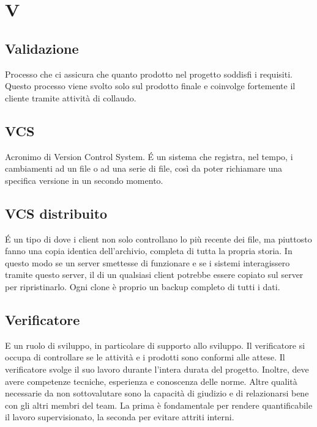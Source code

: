 \section*{V}
\markright{}

\subsection*{Validazione}
Processo che ci assicura che quanto prodotto nel progetto soddisfi i requisiti. Questo processo viene svolto solo sul prodotto finale e coinvolge fortemente il cliente tramite attività di collaudo.

\subsection*{VCS}
Acronimo di Version Control System. \'E un sistema che registra, nel tempo, i cambiamenti ad un file o ad una serie di file, così da poter richiamare una specifica versione in un secondo momento.

\subsection*{VCS distribuito}
\'E un tipo di  dove i client non solo controllano lo  più recente dei file, ma piuttosto fanno una copia identica dell’archivio, completa di tutta la propria storia. In questo modo se un server smettesse di funzionare e se i sistemi interagissero tramite questo server, il  di un qualsiasi client potrebbe essere copiato sul server per ripristinarlo. Ogni clone è proprio un backup completo di tutti i dati.

\subsection*{Verificatore}
E un ruolo di sviluppo, in particolare di supporto allo sviluppo. Il verificatore si occupa di controllare se le attività e i prodotti sono conformi alle attese. Il verificatore svolge il suo lavoro durante l'intera durata del progetto. Inoltre, deve avere competenze tecniche, esperienza e conoscenza delle norme. Altre qualità necessarie da non sottovalutare sono la capacità di giudizio e di relazionarsi bene con gli altri membri del team. La prima è fondamentale per rendere quantificabile il lavoro supervisionato, la seconda per evitare attriti interni.
